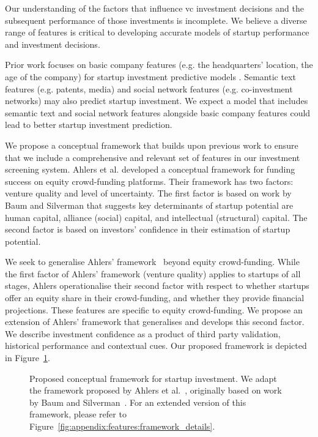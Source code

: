 \documentclass[../thesis/thesis.tex]{subfiles}
\begin{document}
Our understanding of the factors that influence \gls{vc} investment decisions and the subsequent performance of those investments is incomplete. We believe a diverse range of features is critical to developing accurate models of startup performance and investment decisions.

Prior work focuses on basic company features (e.g. the headquarters' location, the age of the company) for startup investment predictive models \cite{beckwith2016, gimmon2010}. Semantic text features (e.g. patents, media) \cite{hoenen2014, yuan2016} and social network features (e.g. co-investment networks) \cite{werth2013, cheng2016, yu2015} may also predict startup investment. We expect a model that includes semantic text and social network features alongside basic company features could lead to better startup investment prediction.

We propose a conceptual framework that builds upon previous work to ensure that we include a comprehensive and relevant set of features in our investment screening system.  Ahlers et al. \cite{ahlers2015} developed a conceptual framework for funding success on equity crowd-funding platforms. Their framework has two factors: venture quality and level of uncertainty. The first factor is based on work by Baum and Silverman \cite{baum2004} that suggests key determinants of startup potential are human capital, alliance (social) capital, and intellectual (structural) capital. The second factor is based on investors' confidence in their estimation of startup potential.

We seek to generalise Ahlers' framework~\cite{ahlers2015} beyond equity crowd-funding. While the first factor of Ahlers' framework (venture quality) applies to startups of all stages, Ahlers operationalise their second factor with respect to whether startups offer an equity share in their crowd-funding, and whether they provide financial projections. These features are specific to equity crowd-funding. We propose an extension of Ahlers' framework that generalises and develops this second factor. We describe investment confidence as a product of third party validation, historical performance and contextual cues. Our proposed framework is depicted in Figure~\ref{fig:litreview:features:framework_simple}.

\begin{figure}[!htb]
    \centering
    
    \caption[Conceptual framework for startup investment.]{Proposed conceptual framework for startup investment. We adapt the framework proposed by Ahlers et al.~\cite{ahlers2015}, originally based on work by Baum and Silverman~\cite{baum2004}. For an extended version of this framework, please refer to Figure~\ref{fig:appendix:features:framework_details}.}
    \label{fig:litreview:features:framework_simple}
\end{figure}
\end{document}
